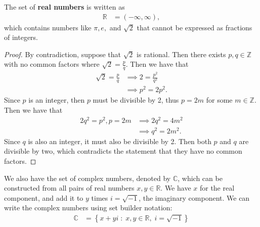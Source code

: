 \documentclass{article}[12pt]
\newtheorem{proposition}{Proposition}
\newcommand{\Z}{\mathbb{Z}}
\newcommand{\R}{\mathbb{R}}
\newcommand{\C}{\mathbb{C}}
\newcommand{\textbox}[1]{\fbox{\parbox{\textwidth}{#1}}}
\begin{document}
            The set of \textbf{real numbers} is written as
            \begin{align}
                \R
                &= (-\infty, \infty), \label{reals-interval}
            \end{align}
            which contains numbers like $\pi, e,$ and $\sqrt{2}$ that cannot be expressed as fractions of integers.
            
            \textbox{
                \begin{proposition}
                    $\sqrt{2}$ is irrational.
                \end{proposition}
            }
            \begin{proof}
                By contradiction, suppose that $\sqrt{2}$ is rational. Then there exists $p, q \in \Z$ with no common factors where $\sqrt{2} = \frac{p}{q}$. Then we have that
                \begin{align*}
                    \sqrt{2} = \frac{p}{q}
                    & \implies
                    2 = \frac{p^2}{q^2} \\
                    & \implies
                    p^2 = 2 p^2.
                \end{align*}
                Since $p$ is an integer, then $p$ must be divisible by 2, thus $p = 2m$ for some $m \in \Z$. Then we have that \begin{align*}
                    2 q^2 = p^2, p = 2m
                    & \implies
                    2 q^2 = 4m^2 \\
                    & \implies 
                    q^2 = 2m^2.
                \end{align*}
                Since $q$ is also an integer, it must also be divisible by 2. Then both $p$ and $q$ are divisible by two, which contradicts the statement that they have no common factors.
            \end{proof}
            
            We also have the set of complex numbers, denoted by $\C$, which can be constructed from all pairs of real numbers $x, y \in \R$. We have $x$ for the real component, and add it to $y$ times $i = 
            \sqrt{-1}$, the imaginary component. We can write the complex numbers using set builder notation:
            \begin{align}
                \C
                &= \left\{ x + y i \; : \; x, y \in \R, \; i = \sqrt{-1} \label{complex} \right\}
            \end{align}
            
\end{document}
